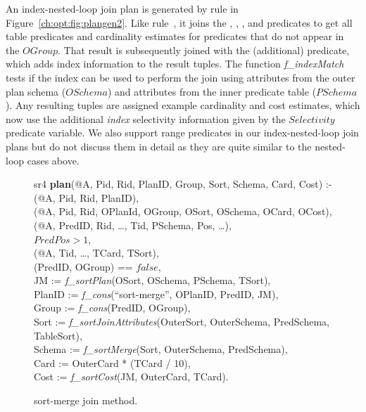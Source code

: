 An index-nested-loop join plan is generated by rule  in
Figure~\ref{ch:opt:fig:plangen2}.  Like rule~, it joins the
, , , and  predicates
to get all table predicates and cardinality estimates for predicates that do
not appear in the $OGroup$.  That result is subsequently joined with the
(additional)  predicate, which adds index information to the
result tuples.  The function {\em f\_indexMatch} tests if the index can be used
to perform the join using attributes from the outer plan schema ($OSchema$) and
attributes from the inner predicate table ($PSchema$).  Any resulting tuples
are assigned example cardinality and cost estimates, which now use the
additional {\em index} selectivity information given by the $Selectivity$
 predicate variable.  We also support range predicates in our
index-nested-loop join plans but do not discuss them in detail as they are
quite similar to the nested-loop cases above.

\begin{figure*}
\ssp
\centering
\begin{boxedminipage}{\linewidth}

sr4 {\bf plan}(@A, Pid, Rid, PlanID, Group, Sort, Schema, Card, Cost) :- \\
(@A, Pid, Rid, PlanID),\\
(@A, Pid, Rid, OPlanId, OGroup, OSort, OSchema, OCard, OCost), \\
(@A, PredID, Rid, \ldots, Tid, PSchema, Pos, \ldots), \\
\datalogspace $PredPos > 1$,\\
(@A, Tid, \ldots, TCard, TSort),\\
(PredID, OGroup) == $false$,\\
\datalogspace JM     := {\em f\_sortPlan}(OSort, OSchema, PSchema, TSort), \\
\datalogspace PlanID := {\em f\_cons}(``sort-merge'', OPlanID, PredID, JM), \\
\datalogspace Group  := {\em f\_cons}(PredID, OGroup), \\
\datalogspace Sort   := {\em f\_sortJoinAttributes}(OuterSort, OuterSchema, PredSchema, TableSort), \\  
\datalogspace Schema := {\em f\_sortMerge}(Sort, OuterSchema, PredSchema),\\
\datalogspace Card   := OuterCard * (TCard / 10),\\
\datalogspace Cost   := {\em f\_sortCost}(JM, OuterCard, TCard).

\end{boxedminipage}
\caption{\label{ch:opt:fig:plangen3}sort-merge join method.}
\end{figure*}

